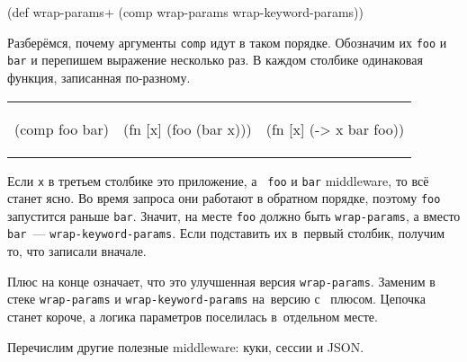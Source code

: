 
\begin{english}
  \begin{clojure}
(def wrap-params+ (comp wrap-params wrap-keyword-params))
  \end{clojure}
\end{english}

Разберёмся, почему аргументы \verb|comp| идут в таком порядке. Обозначим
их \verb|foo| и \verb|bar| и перепишем выражение несколько раз. В каждом
столбике одинаковая функция, записанная по-разному.

\noindent
\begin{tabular}{ @{}p{3.2cm} @{}p{3.5cm} @{}p{3.5cm} }

\begin{english}
  \begin{clojure}
(comp foo bar)
  \end{clojure}
\end{english}

&

\begin{english}
  \begin{clojure}
(fn [x]
  (foo (bar x)))
  \end{clojure}
\end{english}

&

\begin{english}
  \begin{clojure}
(fn [x] (-> x
            bar
            foo))
  \end{clojure}
\end{english}

\end{tabular}

Если \verb|x| в третьем столбике это приложение, а~ \verb|foo| и
\verb|bar| middleware, то всё станет ясно. Во время запроса они работают в
обратном порядке, поэтому \verb|foo| запустится раньше \verb|bar|. Значит,
на месте \verb|foo| должно быть \verb|wrap-params|, а вместо
\verb|bar|~--- \verb|wrap-keyword-params|. Если подставить их в~первый
столбик, получим то, что записали вначале.

Плюс на конце означает, что это улучшенная версия \verb|wrap-params|. Заменим
в стеке \verb|wrap-params| и \verb|wrap-keyword-params| на~версию с~
плюсом. Цепочка станет короче, а логика параметров поселилась в~отдельном месте.

Перечислим другие полезные middleware: куки, сессии и JSON.

